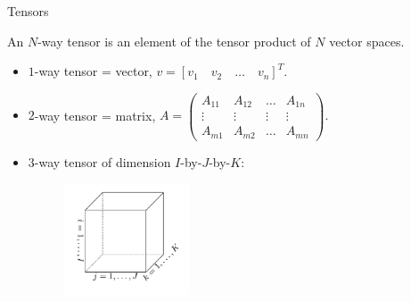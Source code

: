 \documentclass[xcolor={dvipsnames,svgnames}]{beamer}
\begin{document}


\begin{frame}{Tensors}
\begin{defn}[Tensors]
    An $N$-way tensor is an element of the tensor product of $N$ vector spaces. 
    \begin{itemize}
        \item $1$-way tensor = vector, $v = [v_1 \quad v_2 \quad \dots \quad v_n]^T.$
        \vfill
        \item $2$-way tensor = matrix, 
        $A = \left(\begin{matrix}
        A_{1 1} & A_{1 2} & \dots & A_{1 n}\\
        \vdots & \vdots & \vdots & \vdots \\ 
        A_{m 1} & A_{m 2} & \dots & A_{m n}
        \end{matrix}
        \right).$
        \vfill
        \item $3$-way tensor of dimension $I$-by-$J$-by-$K$:
    \begin{figure}[H]
    \centering
    \includegraphics[width=0.35\textwidth]{figures-tensor/tensor-vis.png}
    \end{figure} 
    \end{itemize}
    \end{defn}
\end{frame}
\end{document}

